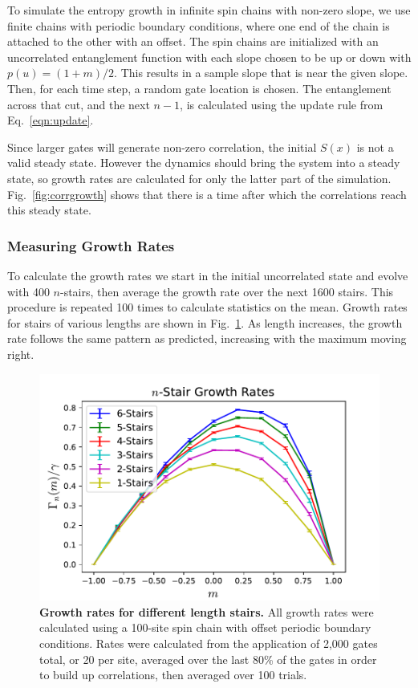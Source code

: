 To simulate the entropy growth in infinite spin chains with non-zero slope, we use finite chains with periodic boundary conditions, where one end of the chain is attached to the other with an offset. The spin chains are initialized with an uncorrelated entanglement function with each slope chosen to be up or down with $p(u)=(1+m)/2$. This results in a sample slope that is near the given slope. Then, for each time step, a random gate location is chosen. The entanglement across that cut, and the next $n-1$, is calculated using the update rule from Eq.~\ref{eqn:update}.

Since larger gates will generate non-zero correlation, the initial $S(x)$ is not a valid steady state. However the dynamics should bring the system into a steady state, so growth rates are calculated for only the latter part of the simulation. Fig.~\ref{fig:corrgrowth} shows that there is a time after which the correlations reach this steady state.

\subsubsection{Measuring Growth Rates}  \label{subsub:growthrates}

To calculate the growth rates we start in the initial uncorrelated state and evolve with 400 $n$-stairs, then average the growth rate over the next 1600 stairs. This procedure is repeated 100 times to calculate statistics on the mean. Growth rates for stairs of various lengths are shown in Fig.~\ref{fig:compareRates}. As length increases, the growth rate follows the same pattern as predicted, increasing with the maximum moving right. 
\begin{figure}
	\centering
	\includegraphics[width=.5\textwidth]{compareRates.pdf}
	\caption{\textbf{Growth rates for different length stairs.} All growth rates were calculated using a 100-site spin chain with offset periodic boundary conditions. Rates were calculated from the application of 2,000 gates total, or 20 per site, averaged over the last 80\% of the gates in order to build up correlations, then averaged over 100 trials.}
	\label{fig:compareRates}
\end{figure}

